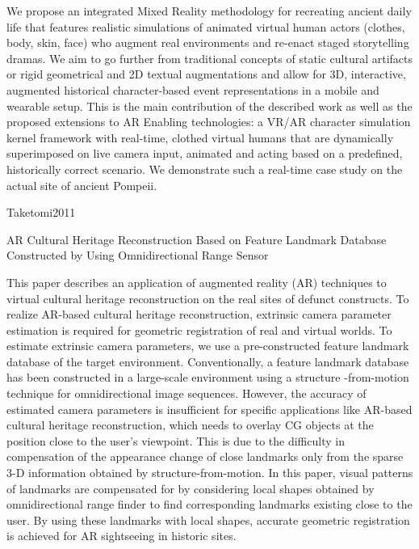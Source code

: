 We propose an integrated Mixed Reality methodology for recreating ancient daily life that features realistic simulations of animated virtual human actors (clothes, body, skin, face) who augment real environments and re-enact staged storytelling dramas. We aim to go further from traditional concepts of static cultural artifacts or rigid geometrical and 2D textual augmentations and allow for 3D, interactive, augmented historical character-based event representations in a mobile and wearable setup. This is the main contribution of the described work as well as the proposed extensions to AR Enabling technologies: a VR/AR character simulation kernel framework with real-time, clothed virtual humans that are dynamically superimposed on live camera input, animated and acting based on a predefined, historically correct scenario. We demonstrate such a real-time case study on the actual site of ancient Pompeii.


Taketomi2011

AR Cultural Heritage Reconstruction Based on Feature Landmark Database Constructed by Using Omnidirectional Range Sensor

This paper describes an application of augmented reality (AR) techniques to virtual cultural heritage reconstruction on the real sites of defunct constructs. To realize AR-based cultural heritage reconstruction, extrinsic camera parameter estimation is required for geometric registration of real and virtual worlds. To estimate extrinsic camera parameters, we use a pre-constructed feature landmark database of the target environment. Conventionally, a feature landmark database has been constructed in a large-scale environment using a structure -from-motion technique for omnidirectional image sequences. However, the accuracy of estimated camera parameters is insufficient for specific applications like AR-based cultural heritage reconstruction, which needs to overlay CG objects at the position close to the user’s viewpoint. This is due to the difficulty in compensation of the appearance change of close landmarks only from the sparse 3-D information obtained by structure-from-motion. In this paper, visual patterns of landmarks are compensated for by considering local shapes obtained by omnidirectional range finder to find corresponding landmarks existing close to the user. By using these landmarks with local shapes, accurate geometric registration is achieved for AR sightseeing in historic sites.


